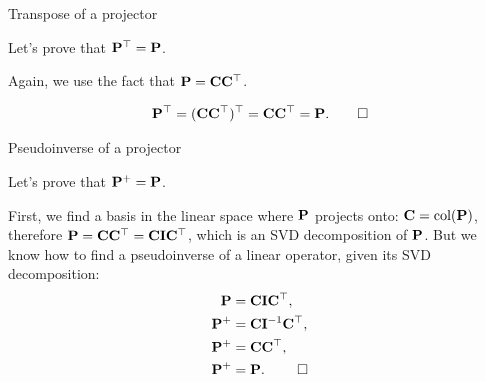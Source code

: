 \documentclass{beamer}
\begin{document}
\begin{frame}{Transpose of a projector}
	\begin{flushleft}
		
		Let's prove that $\mathbf{P}^\top = \mathbf{P}$. 
		
		Again, we use the fact that $\mathbf{P} = \mathbf{C}\mathbf{C}^\top$.
		
		\begin{align}
			\mathbf{P}^\top = (\mathbf{C}\mathbf{C}^\top)^\top=\mathbf{C}\mathbf{C}^\top=\mathbf{P}. \qed
		\end{align}
		
		
	\end{flushleft}
\end{frame}



\begin{frame}{Pseudoinverse of a projector}
	\begin{flushleft}
		
		Let's prove that $\mathbf{P}^+ = \mathbf{P}$. 
		
		\bigskip
		
		First, we find a basis in the linear space where $\mathbf{P}$ projects onto: $\mathbf{C} = \text{col}(\mathbf{P})$, therefore $\mathbf{P} = \mathbf{C}\mathbf{C}^\top = \mathbf{C}\mathbf{I}\mathbf{C}^\top$, which is an SVD decomposition of $\mathbf{P}$. But we know how to find a pseudoinverse of a linear operator, given its SVD decomposition:
		\begin{align}
			\mathbf{P} &= \mathbf{C}\mathbf{I}\mathbf{C}^\top,
			\\
			\mathbf{P}^+ &= \mathbf{C}\mathbf{I}^{-1}\mathbf{C}^\top,
			\\
			\mathbf{P}^+ &= \mathbf{C}\mathbf{C}^\top,
			\\
			\mathbf{P}^+ &= \mathbf{P}. \ \qed
		\end{align}
		
		
	\end{flushleft}
\end{frame}
\end{document}
